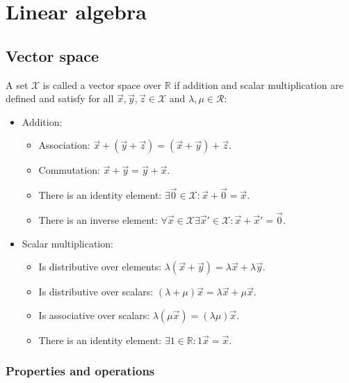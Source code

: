 \chapter{Linear algebra}

\section{Vector space}
A set $\mathcal{X}$ is called a vector space over $\mathbb{R}$ if addition and scalar multiplication are defined and satisfy for all $\vec{x},\vec{y},\vec{z}\in\mathcal{X}$ and $\lambda,\mu\in\mathcal{R}$:

\begin{multicols}{2}
	\begin{itemize}
		\item Addition:
			\begin{itemize}
				\item Association: $\vec{x}+(\vec{y}+\vec{z}) = (\vec{x}+\vec{y})+\vec{z}$.
				\item Commutation: $\vec{x}+\vec{y} = \vec{y}+\vec{x}$.
				\item There is an identity element: $\exists \vec{0}\in\mathcal{X}:\vec{x}+\vec{0} = \vec{x}$.
				\item There is an inverse element: $\forall \vec{x}\in\mathcal{X} \exists \vec{x}'\in\mathcal{X}:\vec{x}+\vec{x}'=\vec{0}$.
			\end{itemize}
			\columnbreak
		\item Scalar multiplication:
			\begin{itemize}
				\item Is distributive over elements: $\lambda(\vec{x}+\vec{y}) = \lambda \vec{x} + \lambda \vec{y}$.
				\item Is distributive over scalars: $(\lambda+\mu)\vec{x} = \lambda \vec{x} + \mu \vec{x}$.
				\item Is associative over scalars: $\lambda(\mu \vec{x}) = (\lambda\mu)\vec{x}$.
				\item There is an identity element: $\exists 1\in\mathbb{R}: 1\vec{x}=\vec{x}$.
			\end{itemize}
	\end{itemize}
\end{multicols}

	\subsection{Properties and operations}

